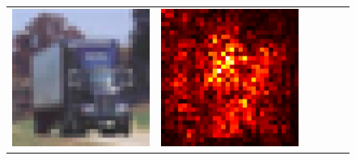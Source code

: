 \documentclass[preprint,12pt]{elsarticle}
\begin{document}
\begin{figure}[p]
\begin{tabular}{cccccc}
  \includegraphics[scale=\scale]{../visualizations/examples/cifar10/resnet18/images/9.png} &
  \includegraphics[scale=\scale]{../visualizations/examples/cifar10/resnet18/saliency_map/9.png} & 

\end{tabular}
\end{figure}
\end{document}
